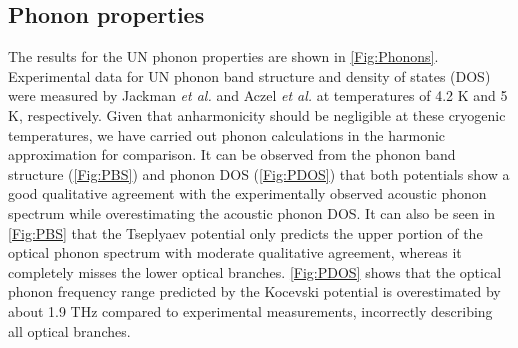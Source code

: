 \documentclass[preprint, 12pt]{elsarticle}
\begin{document}
\subsection{Phonon properties}
\label{sub:phonon}

The results for the UN phonon properties are shown in \cref{Fig:Phonons}. Experimental data for UN phonon band structure and density of states (DOS) were measured by Jackman \textit{et al.} \cite{Jackman1986} and Aczel \textit{et al.} \cite{Aczel2012} at temperatures of 4.2 K and 5 K, respectively. Given that anharmonicity should be negligible at these cryogenic temperatures, we have carried out phonon calculations in the harmonic approximation for comparison. It can be observed from the phonon band structure (\cref{Fig:PBS}) and phonon DOS (\cref{Fig:PDOS}) that both potentials show a good qualitative agreement with the experimentally observed acoustic phonon spectrum while overestimating the acoustic phonon DOS. It can also be seen in \cref{Fig:PBS} that the Tseplyaev potential only predicts the upper portion of the optical phonon spectrum with moderate qualitative agreement, whereas it completely misses the lower optical branches. \cref{Fig:PDOS} shows that the optical phonon frequency range predicted by the Kocevski potential is overestimated by about 1.9 THz compared to experimental measurements, incorrectly describing all optical branches.

\end{document}
